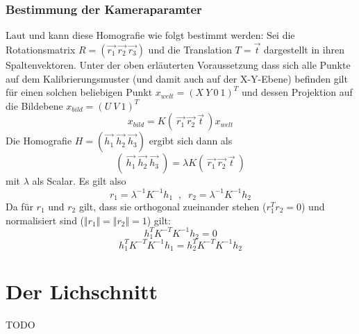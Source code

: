 \subsubsection{Bestimmung der Kameraparamter}
Laut \cite{Zhang:00} und \cite{Rahmann} kann diese Homografie wie folgt bestimmt werden: Sei die Rotationsmatrix \(R = \left(\vec{r_1}\:\vec{r_2}\:\vec{r_3}\right)\) und die Translation \(T = \vec{t}\) dargestellt in ihren Spaltenvektoren. Unter der oben erläuterten Voraussetzung dass sich alle Punkte auf dem Kalibrierungsmuster (und damit auch auf der X-Y-Ebene) befinden gilt für einen solchen beliebigen Punkt \(x_{welt} = (X\:Y\:0\:1)^{T}\) und dessen Projektion auf die Bildebene \(x_{bild} = (U\:V\:1)^{T}\)
\begin{equation}
	x_{bild} = K\left(\:\vec{r_1}\:\vec{r_2}\:\vec{t}\:\right)x_{welt}
\end{equation}
Die Homografie \(H = \left(\vec{h_1}\:\vec{h_2}\:\vec{h_3}\right)\) ergibt sich dann als
\begin{equation}
	\left(\:\vec{h_1}\:\vec{h_2}\:\vec{h_3}\:\right) = \lambda K\left(\:\vec{r_1}\:\vec{r_2}\:\vec{t}\:\right)
\end{equation}
mit \(\lambda\) als Scalar. Es gilt also
\begin{equation}
r_1 = \lambda^{-1} K^{-1} h_1 \;\;,\;\; r_2 = \lambda^{-1} K^{-1} h_2
\end{equation}
Da für \(r_1\) und \(r_2\) gilt, dass sie orthogonal zueinander stehen (\(r_1^Tr_2=0\)) und normalisiert sind (\(\Vert r_1 \Vert = \Vert r_2 \Vert = 1\)) gilt:
\begin{equation}
	h_1^{T} K^{-T} K^{-1} h_2 = 0
\end{equation}
\begin{equation}
	h_1^{T} K^{-T} K^{-1} h_1 = h_2^{T} K^{-T} K^{-1} h_2
\end{equation}
\section{Der Lichschnitt}
TODO
